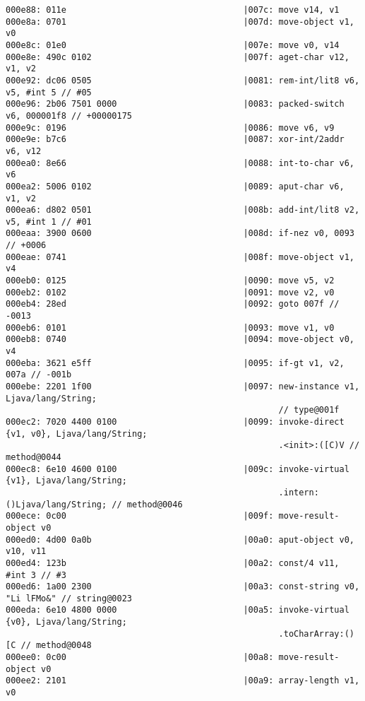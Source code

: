 \begin{lstlisting}
000e88: 011e                                   |007c: move v14, v1
000e8a: 0701                                   |007d: move-object v1, v0
000e8c: 01e0                                   |007e: move v0, v14
000e8e: 490c 0102                              |007f: aget-char v12, v1, v2
000e92: dc06 0505                              |0081: rem-int/lit8 v6, v5, #int 5 // #05
000e96: 2b06 7501 0000                         |0083: packed-switch v6, 000001f8 // +00000175
000e9c: 0196                                   |0086: move v6, v9
000e9e: b7c6                                   |0087: xor-int/2addr v6, v12
000ea0: 8e66                                   |0088: int-to-char v6, v6
000ea2: 5006 0102                              |0089: aput-char v6, v1, v2
000ea6: d802 0501                              |008b: add-int/lit8 v2, v5, #int 1 // #01
000eaa: 3900 0600                              |008d: if-nez v0, 0093 // +0006
000eae: 0741                                   |008f: move-object v1, v4
000eb0: 0125                                   |0090: move v5, v2
000eb2: 0102                                   |0091: move v2, v0
000eb4: 28ed                                   |0092: goto 007f // -0013
000eb6: 0101                                   |0093: move v1, v0
000eb8: 0740                                   |0094: move-object v0, v4
000eba: 3621 e5ff                              |0095: if-gt v1, v2, 007a // -001b
000ebe: 2201 1f00                              |0097: new-instance v1, Ljava/lang/String;
                                                      // type@001f
000ec2: 7020 4400 0100                         |0099: invoke-direct {v1, v0}, Ljava/lang/String;
                                                      .<init>:([C)V // method@0044
000ec8: 6e10 4600 0100                         |009c: invoke-virtual {v1}, Ljava/lang/String;
                                                      .intern:()Ljava/lang/String; // method@0046
000ece: 0c00                                   |009f: move-result-object v0
000ed0: 4d00 0a0b                              |00a0: aput-object v0, v10, v11
000ed4: 123b                                   |00a2: const/4 v11, #int 3 // #3
000ed6: 1a00 2300                              |00a3: const-string v0, "Li lFMo&" // string@0023
000eda: 6e10 4800 0000                         |00a5: invoke-virtual {v0}, Ljava/lang/String;
                                                      .toCharArray:()[C // method@0048
000ee0: 0c00                                   |00a8: move-result-object v0
000ee2: 2101                                   |00a9: array-length v1, v0

\end{lstlisting}

